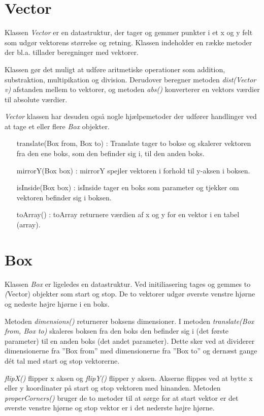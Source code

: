 \section{Vector}

Klassen \emph{Vector} er en datastruktur, der tager og gemmer punkter i et x og y felt som udgør vektorens størrelse og retning. Klassen indeholder en række metoder der bl.a. tillader beregninger med vektorer.

Klassen gør det muligt at udføre aritmetiske operationer som addition, substraktion, multipikation og division. Derudover beregner metoden \emph{dist(Vector v)} afstanden mellem to vektorer, og metoden \emph{abs()} konverterer en vektors værdier til absolute værdier.

\emph{Vector} klassen har desuden også nogle hjælpemetoder der udfører handlinger ved at tage et eller flere \emph{Box} objekter.

\begin{itemize}
	\item [translate(Box from, Box to)]: Translate tager to bokse og skalerer vektoren fra den ene boks, som den befinder sig i, til den anden boks.
	\item [mirrorY(Box box)]: mirrorY spejler vektoren i forhold til y-aksen i boksen.
	\item [isInside(Box box)]: isInside tager en boks som parameter og tjekker om vektoren befinder sig i boksen.
	\item [toArray()]: toArray returnere værdien af x og y for en vektor i en tabel (array).
\end{itemize}

\section{Box}

Klassen \emph{Box} er ligeledes en datastruktur. Ved initiliasering tages og gemmes to \emph(Vector) objekter som start og stop. De to vektorer udgør øverste venstre hjørne og nedeste højre hjørne i en boks.

Metoden \emph{dimensions()} returnerer boksens dimensioner. I metoden \emph{translate(Box from, Box to)} skaleres boksen fra den boks den befinder sig i (det første parameter) til en anden boks (det andet parameter). Dette sker ved at dividerer dimensionerne fra ''Box from'' med dimensionerne fra ''Box to'' og dernæst gange dét tal med start og stop vektorerne.

\emph{flipX()} flipper x aksen og \emph{flipY()} flipper y aksen. Akserne flippes ved at bytte x eller y koordinater på start og stop vektoren med hinanden. Metoden \emph{properCorners()} bruger de to metoder til at sørge for at start vektor er det øverste venstre hjørne og stop vektor er i det nederste højre hjørne.


